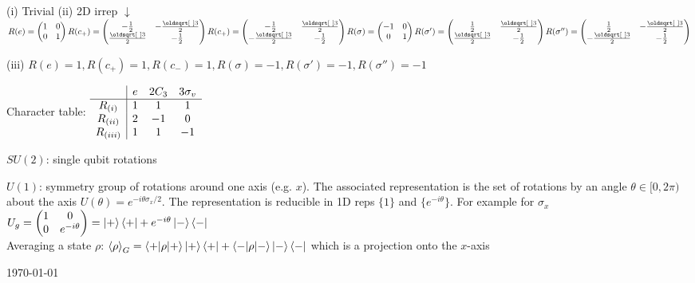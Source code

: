 \columnbreak
{}
\begin{squishlist}
    \item[(i)]
    Trivial \qquad  (ii) 2D irrep $\downarrow$ \\
    $R(e) = \begin{pmatrix} 1 & 0 \\ 0 & 1 \end{pmatrix}
    R(c_+) = \begin{pmatrix} -\frac{1}{2} & -\frac{\sqrt{3}}{2} \\\frac{\sqrt{3}}{2} & -\frac{1}{2} \end{pmatrix}
    R(c_+) = \begin{pmatrix} -\frac{1}{2} & \frac{\sqrt{3}}{2} \\-\frac{\sqrt{3}}{2} & -\frac{1}{2} \end{pmatrix} \\
    R(\sigma) = \begin{pmatrix} -1 & 0 \\ 0 & 1 \end{pmatrix}
    R(\sigma') = \begin{pmatrix} \frac{1}{2} & \frac{\sqrt{3}}{2} \\ \frac{\sqrt{3}}{2} & -\frac{1}{2} \end{pmatrix}
    R(\sigma'') = \begin{pmatrix} \frac{1}{2} & -\frac{\sqrt{3}}{2} \\ -\frac{\sqrt{3}}{2} & -\frac{1}{2} \end{pmatrix}$

    \item[(iii)] $R(e)=1,R(c_+)=1,R(c_-)=1,R(\sigma)=-1,R(\sigma')=-1,R(\sigma'')=-1$
    \item Character table:
    $\begin{array}{c | ccc}
         & e & 2C_3 & 3\sigma_v \\
         \hline
        R_{(i)} & 1 & 1 & 1 \\
        R_{(ii)} & 2 & -1 & 0 \\
        R_{(iii)} & 1 & 1 & -1    
    \end{array}$
\end{squishlist}

\begin{squishlist}
    \item $SU(2)$: single qubit rotations
\item $U(1)$: symmetry group of rotations around one axis (e.g. $x$). The associated representation is the set of rotations by an angle $\theta \in [0 , 2\pi)$ about the axis $U(\theta) = e^{-i\theta \sigma_x / 2}$. The representation is reducible in 1D reps $\{1\}$ and $\{ e^{-i\theta}\}$. For example for $\sigma_x$ $U_g = \begin{pmatrix} 1 & 0 \\ 0 & e^{-i \theta} \end{pmatrix} = \ket{+} \bra{+} + e^{-i\theta}\ket{-} \bra{-}$ \\
Averaging a state $\rho$: $\braket{\rho}_G = \braket{+|\rho|+}\ket{+}\bra{+} + \braket{-|\rho|-}\ket{-}\bra{-}$ which is a projection onto the $x$-axis
\end{squishlist}


    \vfill
\today
